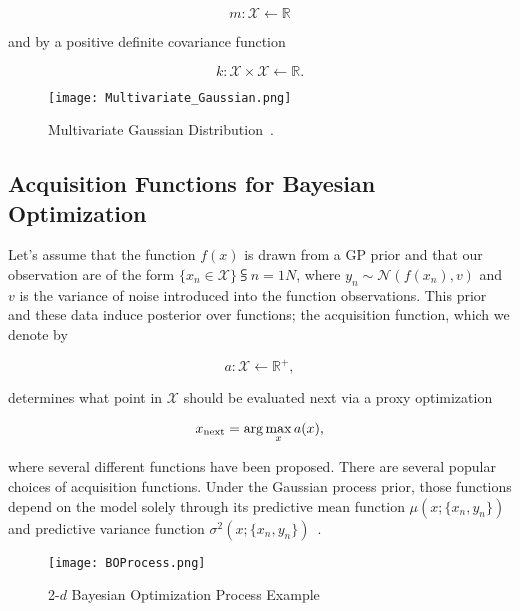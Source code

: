 \begin{equation}
	m : \mathcal{X} \leftarrow \mathbb{R}
\end{equation}

and by a positive definite covariance function 

\begin{equation}
	k : \mathcal{X} \times \mathcal{X} \leftarrow \mathbb{R}.
\end{equation}

\begin{figure} [h!]
	\centering
	\texttt{[image: Multivariate\_Gaussian.png]}
	\caption{Multivariate Gaussian Distribution~\cite{MNDWikipedia}.}
	\label{fig:Multivatiate_Gaussian}
\end{figure}

\subsection{Acquisition Functions for Bayesian Optimization} Let's assume that the function $f(x)$ is drawn from a GP prior and that our observation are of the form $\{x_n \in \mathcal{X}\}\subsup{}{ n=1}{N}$, where $y_n \sim \mathcal{N}(f(x_n), v)$ and $v$ is the variance of noise introduced into the function observations. This prior and these data induce  posterior over functions; the acquisition function, which we denote by

\begin{equation}
	a : \mathcal{X} \leftarrow \mathbb{R}^+,
\end{equation}

determines what point in $\mathcal{X}$ should be evaluated next via a proxy optimization

\begin{equation}
	x\textsubscript{next} = \arg\max_{x}a(x),
\end{equation}

where several different functions have been proposed. There are several popular choices of acquisition functions. Under the Gaussian process prior, those functions depend on the model solely through its predictive mean function $\mu(x; \{x_n, y_n\})$ and predictive variance function $\sigma^2(x; \{x_n, y_n\})$~\cite{NIPS2012_4522}.


\begin{figure} [h!]
	\centering
	\texttt{[image: BOProcess.png]}
	\caption{2-$d$ Bayesian Optimization Process Example~\cite{BayesianOptimizationImage}}
	\label{fig:BoProcess}
\end{figure}

